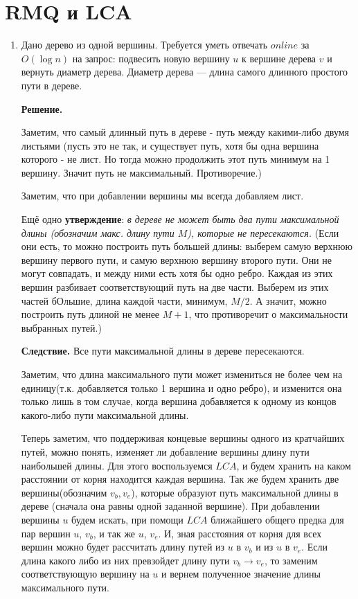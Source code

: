 \section*{RMQ и LCA}
\begin{enumerate}
	\item Дано дерево из одной вершины. Требуется уметь отвечать $online$ за $O(\log n)$ на
	запрос: подвесить новую вершину $u$ к вершине дерева $v$ и вернуть диаметр дерева. Диаметр
	дерева — длина самого длинного простого пути в дереве. 
	
	\textbf{Решение.} 
	
	Заметим, что самый длинный путь в дереве - путь между какими-либо двумя листьями (пусть это 
	не так, и существует путь, хотя бы одна вершина которого - не лист. Но тогда можно 
	продолжить этот путь минимум на 1 вершину. Значит путь не максимальный. Противоречие.)
	
	Заметим, что при добавлении вершины мы всегда добавляем лист. 
	
	Ещё одно \textbf{ утверждение}: \textit{в дереве не может быть два пути максимальной длины 
	(обозначим макс. длину пути $M$), которые не пересекаются.} (Если они есть, то можно 
	построить путь большей длины: выберем самую верхнюю вершину первого пути, и самую верхнюю 
	вершину второго пути. Они не могут совпадать, и между ними есть хотя бы одно ребро. Каждая 
	из этих вершин разбивает соответствующий путь на две части. Выберем из этих частей бОльшие, 
	длина каждой части, минимум, $M / 2$. А значит, можно построить путь длиной не менее $M + 
	1$, что противоречит о максимальности выбранных путей.)
	
	\textbf{Следствие.} Все пути максимальной длины в дереве пересекаются. 
	
	Заметим, что длина максимального пути может измениться не более чем на единицу(т.к. 
	добавляется только 1 вершина и одно ребро), и изменится она только лишь в том случае, когда 
	вершина добавляется к одному из концов какого-либо пути максимальной длины.
	
	Теперь заметим, что поддерживая концевые вершины одного из кратчайших путей, можно понять, 
	изменяет ли добавление вершины длину пути наибольшей длины. Для этого воспользуемся $LCA$, 
	и будем хранить на каком расстоянии от корня находится каждая вершина. Так же будем хранить 
	две вершины(обозначим $v_b, v_e$), которые образуют путь максимальной длины в дереве 
	(сначала она равны одной заданной вершине). При добавлении вершины $u$ будем искать, при 
	помощи $LCA$ ближайшего общего предка для пар вершин $u$, $v_b$, и так же $u$, $v_e$. И, 
	зная расстояния от корня для всех вершин можно будет рассчитать длину путей из $u$ в $v_b$ 
	и из $u$ в $v_e$. Если длина какого либо из них превзойдет длину пути $v_b \to v_e$, то 
	заменим соответствующую вершину на $u$ и вернем полученное значение длины максимального 
	пути.
	

\end{enumerate}
